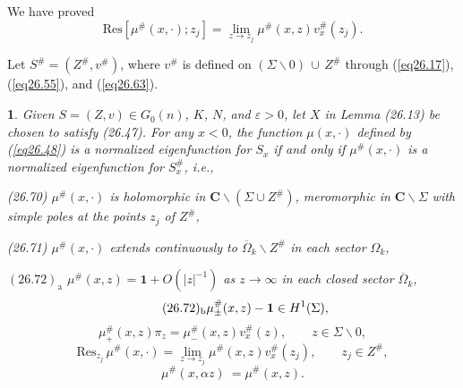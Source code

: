 \documentclass{surv-l}
\theoremstyle{plain}
\newtheorem{prop}[theorem]{\sc{Proposition}}
\theoremstyle{definition}
\numberwithin{equation}{chapter}
\begin{document}
We have proved
\begin{equation}\label{eq26.68}
\mathrm{Res}[\mu^{\#}(x, \cdot);z_{j}]=\lim_{z\rightarrow z_{j}}\mu^{\#}(x, z)v_{x}^{\#}(z_{j}).
\end{equation}

Let $S^\#=(Z^{\#}, v^{\#})$, where $v^{\#}$ is defined on $(\Sigma\backslash 0)\,\cup\, Z^\#$ through (\ref{eq26.17}), (\ref{eq26.55}), and (\ref{eq26.63}).
\renewcommand\thetheorem{26.\arabic{theorem}}
\setcounter{theorem}{68}
\begin{prop}\label{prop26.69}
Given $S=(Z, v)\in G_{0}(n)$, $K$, $N$,  and  $\varepsilon >0$, let
$X$ in Lemma \emph{(26.13)} be chosen to satisfy \emph{(26.47)}. For any $x<0$, the function $\mu(x, \cdot)$ defined by \emph{(\ref{eq26.48})} is a normalized eigenfunction for $S_{x}$ if and only if $\mu^{\#}(x, \cdot)$ is a normalized eigenfunction for $ S_{x}^{\#}$, i.e.,

\emph{(26.70)} $\mu^{\#}(x, \cdot)$ is holomorphic in $\mathbf{C}\backslash (\Sigma\cup Z^{\#})$, meromorphic in $\mathbf{C}\backslash \Sigma$ with simple poles at the points $z_{j}$ of $Z^{\#}$,

\emph{(26.71)} $\mu^{\#}(x, \cdot)$ extends continuously to $\overline{\Omega}_{k}\backslash Z^\#$ in each sector $\Omega_{k}$,

\emph{$(26.72)_{\mathrm{a}}$} $\mu^{\#}(x,z) =\mathbf{1}+O(|z|^{-1})$ as $z\rightarrow\infty$ in each closed sector $\overline{\Omega}_{k}$,
\begin{equation*}
\tag*{$(26.72)_{\mathrm{b}}$}\mu_{\pm}^{\#}(x, z)-\mathbf{1} \in H^{1}(\Sigma),
\end{equation*}
\setcounter{equation}{72}
\begin{equation}\label{eq26.73}
\mu_{+}^{\#}(x, z)\pi_{z}=\mu_{-}^{\#}(x, z)v_{x}^{\#}(z),\qquad z\in\Sigma\backslash 0,
\end{equation}
\begin{equation}\label{eq26.74}
\mathrm{Res}_{z_{j}}\,\mu^{\#}(x, \cdot)=\lim_{z\rightarrow z_{j}}\mu^{\#}(x, z)v_{x}^{\#}(z_{j}),\qquad z_{j}\in Z^{\#},
\end{equation}
\begin{equation}\label{eq26.75}
\mu^{\#}(x, \alpha z)\ =\mu^{\#}(x,z).
\end{equation}
\end{prop}
\end{document}
